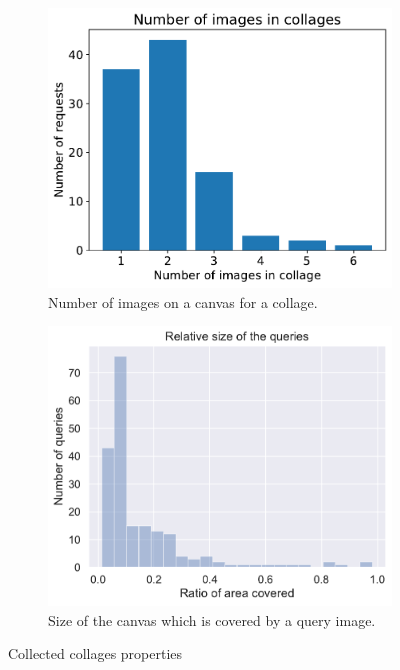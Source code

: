 \begin{figure}
     \centering
     \begin{subfigure}[b]{0.48\textwidth}
         \centering
         \includegraphics[width=\textwidth]{graphs/num_queries_in_request.pdf}
         \caption{Number of images on a canvas for a collage.}
     \end{subfigure}
     \hfill
     \begin{subfigure}[b]{0.48\textwidth}
         \centering
         \includegraphics[width=\textwidth]{graphs/queries_size.pdf}
         \caption{Size of the canvas which is covered by a query image.}
     \end{subfigure}
    
    \caption{Collected collages properties}
    \label{fig:annotated_dataset}
\end{figure}

